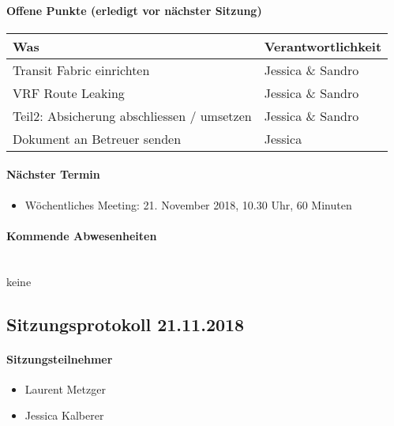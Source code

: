 \paragraph{Offene Punkte (erledigt vor nächster Sitzung)} \mbox{}
\begin{table}[H]
	\centering
	\begin{tabularx}{\textwidth}{X | p{4.5cm}}
		\rowcolor{gray!50}
		\textbf{Was} & \textbf{Verantwortlichkeit} \\
		\hline	
		Transit Fabric einrichten & Jessica \& Sandro  \\
		VRF Route Leaking & Jessica \& Sandro \\
		Teil2: Absicherung abschliessen / umsetzen & Jessica \& Sandro \\
		Dokument an Betreuer senden & Jessica \\
	\end{tabularx}
	\label{tab:my-label}
\end{table}

\paragraph{Nächster Termin}
\begin{itemize}	
	\item Wöchentliches Meeting: 21. November 2018, 10.30 Uhr, 60 Minuten
\end{itemize}

\paragraph{Kommende Abwesenheiten} \mbox{}\\
keine








\subsection{Sitzungsprotokoll 21.11.2018}

\paragraph{Sitzungsteilnehmer}
\begin{itemize}	
	\item Laurent Metzger
	\item Jessica Kalberer
\end{itemize}

